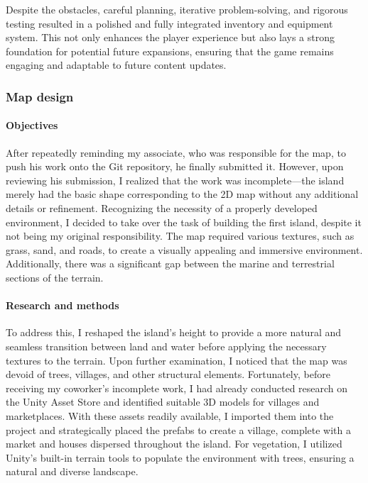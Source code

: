 \documentclass{article}
\begin{document}
Despite the obstacles, careful planning, iterative problem-solving, and rigorous testing resulted in a polished and fully integrated inventory and equipment system. This not only enhances the player experience but also lays a strong foundation for potential future expansions, ensuring that the game remains engaging and adaptable to future content updates.



\subsubsection{Map design}
\paragraph{Objectives}\hfill

After repeatedly reminding my associate, who was responsible for the map, to push his work onto the Git repository, he finally submitted it. However, upon reviewing his submission, I realized that the work was incomplete—the island merely had the basic shape corresponding to the 2D map without any additional details or refinement. Recognizing the necessity of a properly developed environment, I decided to take over the task of building the first island, despite it not being my original responsibility. The map required various textures, such as grass, sand, and roads, to create a visually appealing and immersive environment. Additionally, there was a significant gap between the marine and terrestrial sections of the terrain.

\paragraph{Research and methods}\hfill

To address this, I reshaped the island's height to provide a more natural and seamless transition between land and water before applying the necessary textures to the terrain. Upon further examination, I noticed that the map was devoid of trees, villages, and other structural elements. Fortunately, before receiving my coworker's incomplete work, I had already conducted research on the Unity Asset Store and identified suitable 3D models for villages and marketplaces. With these assets readily available, I imported them into the project and strategically placed the prefabs to create a village, complete with a market and houses dispersed throughout the island. For vegetation, I utilized Unity's built-in terrain tools to populate the environment with trees, ensuring a natural and diverse landscape.
\end{document}
